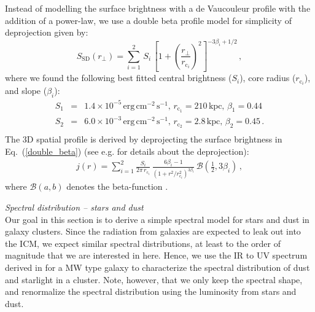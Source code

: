 \documentclass[10pt,aps,pra,reprint,amsmath,amsfonts,amssymb,showpacs]{revtex4-1}
\newcommand{\rmn}{\mathrm}
\newcommand{\sd}{\rmn{SD}}
\begin{document}
Instead of modelling the surface brightness with a de Vaucouleur
profile with the addition of a power-law, we use a double beta profile
model for simplicity of deprojection given by:
\begin{equation}
S_\sd (r_\bot)= \sum_{i=1}^2 \,S_i\, 
\left[1 + \left( \frac{r_\bot}{r_{\mathrm{c}_i}}\right)^2\right]
^{-3\beta_i + 1/2}\,,
\label{double_beta}
\end{equation}
where we found the following best fitted central brightness ($S_i$),
core radius ($r_{\mathrm{c}_i}$), and slope ($\beta_i$):
\begin{eqnarray}
 S_1&=&1.4\times10^{-5}\,\rmn{erg}\,\rmn{cm}^{-2}\,\rmn{s}^{-1},\,
r_{\mathrm{c}_1}=210\,\rmn{kpc},\,
\beta_1=0.44\nonumber\\
 S_2&=&6.0\times10^{-3}\,\rmn{erg}\,\rmn{cm}^{-2}\,\rmn{s}^{-1},\,
r_{\mathrm{c}_2}=2.8\,\rmn{kpc},\,
\beta_2=0.45\,.\nonumber\\
\label{fit_spatial_IR}
\end{eqnarray}
The 3D spatial profile is derived by deprojecting the surface
brightness in Eq.~(\ref{double_beta}) (see
e.g. \cite{2004A&A...413...17P} for details about the deprojection):
\begin{eqnarray}
  j(r)  = \sum_{i=1}^2 \frac{S_i}{2\pi\,r_{\mathrm{c}_i}}\,
  \frac{6 \beta_i - 1}{\left(1 + r^2/r^2_{\mathrm{c}_i}\right)^{3\beta_i}}\,
  \mathcal{B}\left(\frac{1}{2},3\beta_i\right)\,,
\end{eqnarray}
where $\mathcal{B}(a,b)$ denotes the beta-function
\cite{1965hmfw.book.....A}.


{\it Spectral distribution -- stars and dust} \\ Our goal in this
section is to derive a simple spectral model for stars and dust in
galaxy clusters. Since the radiation from galaxies are expected to
leak out into the ICM, we expect similar spectral distributions, at
least to the order of magnitude that we are interested in here. Hence, we
use the IR to UV spectrum derived in \cite{2006ApJ...648L..29P} for a
MW type galaxy to characterize the spectral distribution of dust and
starlight in a cluster. Note, however, that we only keep the spectral
shape, and renormalize the spectral distribution using the luminosity
from stars and dust.
\end{document}
